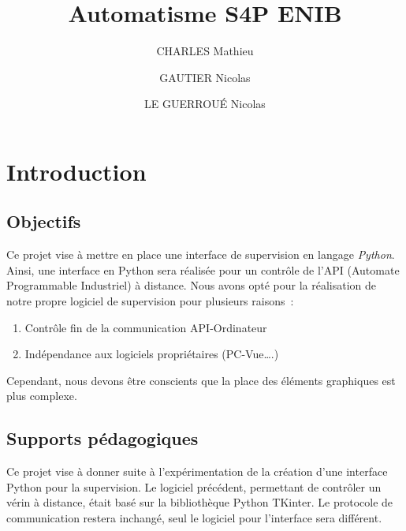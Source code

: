 \documentclass[12pt]{report}    %
\begin{document}
\title{Automatisme S4P ENIB}
\author{CHARLES Mathieu \and GAUTIER Nicolas \and LE GUERROUÉ Nicolas}  
\maketitle 
\tableofcontents



\chapter{Introduction}
\section{Objectifs}


Ce projet vise à mettre en place une interface de supervision en langage \emph{Python}.\newline
Ainsi, une interface en Python sera réalisée pour un contrôle de l’API (Automate Programmable Industriel) à distance. \newline
Nous avons opté pour la réalisation de notre propre logiciel de supervision pour plusieurs raisons : \newline

\begin{enumerate}
\item Contrôle fin de la communication API-Ordinateur
\item Indépendance aux logiciels propriétaires (PC-Vue….) \newline
\end{enumerate} 

Cependant, nous devons être conscients que la place des éléments graphiques est plus complexe.

\section{Supports pédagogiques}

Ce projet vise à donner suite à l'expérimentation de la création d'une interface Python pour la supervision. \newline
Le logiciel précédent, permettant de contrôler un vérin à distance, était basé sur la bibliothèque Python TKinter. \newline
Le protocole de communication restera inchangé, seul le logiciel pour l'interface sera différent.
\end{document}
